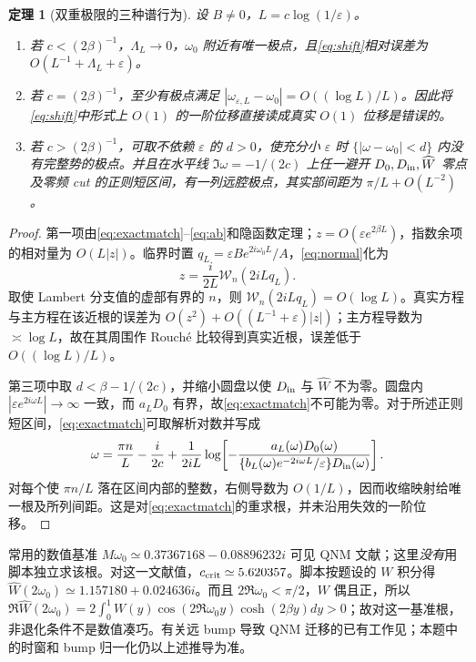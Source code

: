 \documentclass[UTF8,a4paper,11pt]{ctexart}
\newtheorem{theorem}{定理}
\newcommand{\ee}{\varepsilon}
\newcommand{\WW}{\mathcal W}
\begin{document}
\begin{theorem}[双重极限的三种谱行为]\label{thm:spectrum}
设 $B\neq0$，$L=c\log(1/\ee)$。
\begin{enumerate}
\item 若 $c<(2\beta)^{-1}$，$\Lambda_L\to0$，$\omega_0$ 附近有唯一极点，且\eqref{eq:shift}相对误差为 $O(L^{-1}+\Lambda_L+\ee)$。
\item 若 $c=(2\beta)^{-1}$，至少有极点满足
$|\omega_{\ee,L}-\omega_0|=O((\log L)/L)$。因此将\eqref{eq:shift}中形式上 $O(1)$ 的一阶位移直接读成真实 $O(1)$ 位移是错误的。
\item 若 $c>(2\beta)^{-1}$，可取不依赖 $\ee$ 的 $d>0$，使充分小 $\ee$ 时
$\{|\omega-\omega_0|<d\}$ 内没有完整势的极点。并且在水平线
$\Im\omega=-1/(2c)$ 上任一避开 $D_0,D_{\rm in},\widehat W$ 零点及零频 cut 的正则短区间，有一列远腔极点，其实部间距为 $\pi/L+O(L^{-2})$。
\end{enumerate}
\end{theorem}
\begin{proof}
第一项由\eqref{eq:exactmatch}--\eqref{eq:ab}和隐函数定理；$z=O(\ee e^{2\beta L})$，指数余项的相对量为 $O(L|z|)$。临界时置
$q_L=\ee B e^{2i\omega_0L}/A$，\eqref{eq:normal}化为
\begin{equation}\label{eq:lambert}
 z=\frac{i}{2L}\WW_n(2iLq_L).
\end{equation}
取使 Lambert 分支值的虚部有界的 $n$，则 $\WW_n(2iLq_L)=O(\log L)$。真实方程与主方程在该近根的误差为
$O(z^2)+O((L^{-1}+\ee)|z|)$；主方程导数为 $\asymp\log L$，故在其周围作 Rouché 比较得到真实近根，误差低于 $O((\log L)/L)$。

第三项中取 $d<\beta-1/(2c)$，并缩小圆盘以使 $D_{\rm in}$ 与 $\widehat W$ 不为零。圆盘内
$|\ee e^{2i\omega L}|\to\infty$ 一致，而 $a_LD_0$ 有界，故\eqref{eq:exactmatch}不可能为零。对于所述正则短区间，\eqref{eq:exactmatch}可取解析对数并写成
\begin{equation*}
 \omega=\frac{\pi n}{L}-\frac{i}{2c}
 +\frac{1}{2iL}
 \log\!\left[-\frac{a_L(\omega)D_0(\omega)}
 {\{b_L(\omega)e^{-2i\omega L}/\ee\}D_{\rm in}(\omega)}\right].
\end{equation*}
对每个使 $\pi n/L$ 落在区间内部的整数，右侧导数为 $O(1/L)$，因而收缩映射给唯一根及所列间距。这是对\eqref{eq:exactmatch}的重求根，并未沿用失效的一阶位移。
\end{proof}

常用的数值基准 $M\omega_0\simeq0.37367168-0.08896232i$ 可见 QNM 文献\cite{Berti}；这里\emph{没有}用脚本独立求该根。对这一文献值，$c_{\rm crit}\simeq5.620357$。脚本按题设的 $W$ 积分得
$\widehat W(2\omega_0)\simeq1.157180+0.024636i$。而且 $2\Re\omega_0<\pi/2$，$W$ 偶且正，所以
$\Re\widehat W(2\omega_0)
=2\int_0^1W(y)\cos(2\Re\omega_0y)\cosh(2\beta y)dy>0$；故对这一基准根，非退化条件不是数值凑巧。有关远 bump 导致 QNM 迁移的已有工作见\cite{Cheung,Yang,Kyutoku}；本题中的时窗和 bump 归一化仍以上述推导为准。
\end{document}

